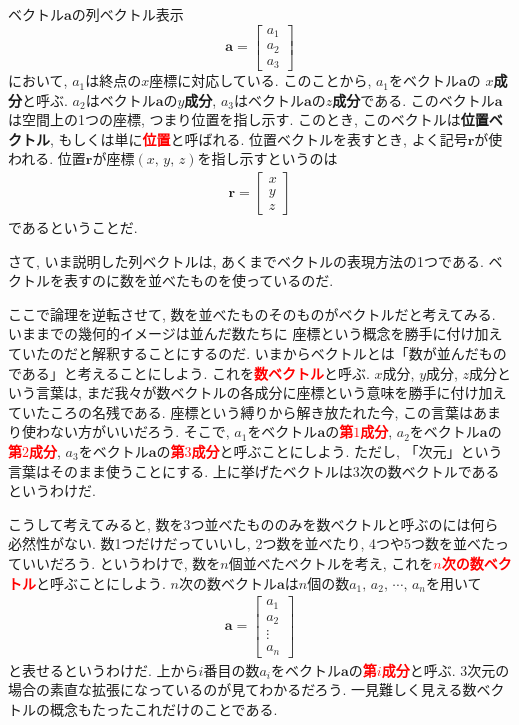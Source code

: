 ベクトル$\bm{a}$の列ベクトル表示
$$
\bm{a} = \left[
 \begin{array}{c}
    a_1 \\
    a_2 \\
    a_3
 \end{array}
           \right]
$$
において, $a_1$は終点の$x$座標に対応している. このことから, $a_1$をベクトル$\bm{a}$の
\textbf{$x$成分}と呼ぶ. 
$a_2$はベクトル$\bm{a}$の\textbf{$y$成分}, 
$a_3$はベクトル$\bm{a}$の\textbf{$z$成分}である. 
このベクトル$\bm{a}$は空間上の1つの座標, つまり位置を指し示す. 
このとき, このベクトルは\textbf{位置ベクトル}, 
もしくは単に\textbf{\textcolor{red}{位置}}と呼ばれる. 位置ベクトルを表すとき, よく記号$\bm{r}$が使われる. 
位置$\bm{r}$が座標$(x, \, y, \, z)$を指し示すというのは
\begin{eqnarray}
\bm{r} = \left[
 \begin{array}{c}
  x \\
  y \\ 
  z 
 \end{array}
   \right]
\label{eq:itivec}
\end{eqnarray}
であるということだ. 

さて, いま説明した列ベクトルは, あくまでベクトルの表現方法の1つである. 
ベクトルを表すのに数を並べたものを使っているのだ. 

ここで論理を逆転させて, 数を並べたものそのものがベクトルだと考えてみる. いままでの幾何的イメージは並んだ数たちに
座標という概念を勝手に付け加えていたのだと解釈することにするのだ. 
いまからベクトルとは「数が並んだものである」と考えることにしよう. 
これを\textbf{\textcolor{red}{数ベクトル}}と呼ぶ. 
$x$成分, $y$成分, $z$成分という言葉は, まだ我々が数ベクトルの各成分に座標という意味を勝手に付け加えていたころの名残である. 
座標という縛りから解き放たれた今, この言葉はあまり使わない方がいいだろう. 
そこで, $a_1$をベクトル$\bm{a}$の\textbf{\textcolor{red}{第$1$成分}}, 
$a_2$をベクトル$\bm{a}$の\textbf{\textcolor{red}{第$2$成分}}, 
$a_3$をベクトル$\bm{a}$の\textbf{\textcolor{red}{第$3$成分}}と呼ぶことにしよう. ただし, 「次元」という言葉はそのまま使うことにする. 
上に挙げたベクトルは3次の数ベクトルであるというわけだ. 

こうして考えてみると, 数を3つ並べたもののみを数ベクトルと呼ぶのには何ら必然性がない. 
数1つだけだっていいし, 2つ数を並べたり, 4つや5つ数を並べたっていいだろう. 
というわけで, 数を$n$個並べたベクトルを考え, これを\textbf{\textcolor{red}{$n$次の数ベクトル}}と呼ぶことにしよう. 
$n$次の数ベクトル$\bm{a}$は$n$個の数$a_1, \, a_2, \, \cdots , \, a_n$を用いて
\begin{eqnarray}
\bm{a} = \left[
 \begin{array}{c}
   a_1 \\
   a_2 \\
   \vdots \\
   a_n 
 \end{array}
            \right]
\label{eq:vecnd}
\end{eqnarray}
と表せるというわけだ. 上から$i$番目の数$a_i$をベクトル$\bm{a}$の\textbf{\textcolor{red}{第$i$成分}}と呼ぶ. 
3次元の場合の素直な拡張になっているのが見てわかるだろう. 一見難しく見える数ベクトルの概念もたったこれだけのことである. 

